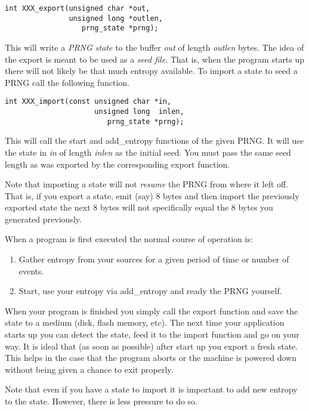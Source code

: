 \documentclass[synpaper]{book}
\begin{document}
\begin{verbatim}
int XXX_export(unsigned char *out,
               unsigned long *outlen,
                  prng_state *prng);
\end{verbatim}

This will write a \textit{PRNG state} to the buffer \textit{out} of length \textit{outlen} bytes.  The idea of
the export is meant to be used as a \textit{seed file}.  That is, when the program starts up there will not likely
be that much entropy available.   To import a state to seed a PRNG call the following function.

\begin{verbatim}
int XXX_import(const unsigned char *in,
                     unsigned long  inlen,
                        prng_state *prng);
\end{verbatim}

This will call the start and add\_entropy functions of the given PRNG.  It will use the state in
\textit{in} of length \textit{inlen} as the initial seed.  You must pass the same seed length as was exported
by the corresponding export function.

Note that importing a state will not \textit{resume} the PRNG from where it left off.  That is, if you export
a state, emit (say) 8 bytes and then import the previously exported state the next 8 bytes will not
specifically equal the 8 bytes you generated previously.

When a program is first executed the normal course of operation is:

\begin{enumerate}
   \item Gather entropy from your sources for a given period of time or number of events.
   \item Start, use your entropy via add\_entropy and ready the PRNG yourself.
\end{enumerate}

When your program is finished you simply call the export function and save the state to a medium (disk,
flash memory, etc).  The next time your application starts up you can detect the state, feed it to the
import function and go on your way.  It is ideal that (as soon as possible) after start up you export a
fresh state.  This helps in the case that the program aborts or the machine is powered down without
being given a chance to exit properly.

Note that even if you have a state to import it is important to add new entropy to the state.  However,
there is less pressure to do so.
\end{document}
